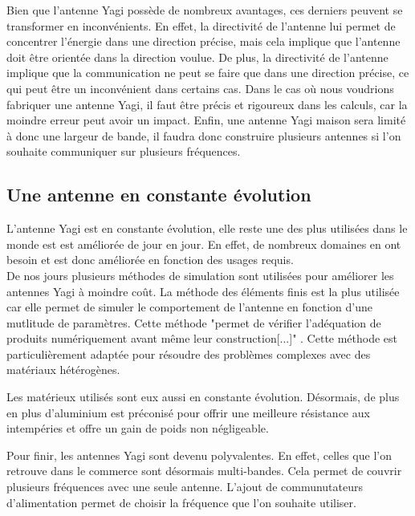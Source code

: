 \documentclass[12pt, a4paper]{article}
\begin{document}
Bien que l'antenne Yagi possède de nombreux avantages, ces derniers
peuvent se transformer en inconvénients. En effet, la directivité de l'antenne
lui permet de concentrer l'énergie dans une direction
précise, mais cela implique que l'antenne doit être
orientée dans la direction voulue. De plus, la directivité
de l'antenne implique que la communication ne peut se faire
que dans une direction précise, ce qui peut être un inconvénient
dans certains cas. Dans le cas où nous voudrions fabriquer
une antenne Yagi, il faut être précis et rigoureux dans
les calculs, car la moindre erreur peut avoir un impact. 
Enfin, une antenne Yagi maison sera limité à donc une
largeur de bande, il faudra donc construire plusieurs antennes
si l'on souhaite communiquer sur plusieurs fréquences.\\

\subsection{Une antenne en constante évolution}
L'antenne Yagi est en constante évolution, elle reste 
une des plus utilisées dans le monde est 
est améliorée de jour en jour. En effet, de nombreux 
domaines en ont besoin et est donc améliorée en
fonction des usages requis.\\

De nos jours plusieurs méthodes de simulation
sont utilisées pour améliorer les antennes Yagi à moindre
coût. La méthode des éléments finis est la plus utilisée
car elle permet de simuler le comportement de l'antenne
en fonction d'une mutlitude de paramètres. Cette méthode 
"permet de vérifier l'adéquation de produits 
numériquement avant même leur construction[...]" \cite{r3}.
Cette méthode est particulièrement adaptée pour 
résoudre des problèmes complexes avec des matériaux 
hétérogènes.

Les matérieux utilisés sont eux aussi en constante 
évolution. Désormais, de plus en plus d'aluminium 
est préconisé pour offrir une meilleure résistance 
aux intempéries et offre un gain de poids non négligeable.

Pour finir, les antennes Yagi sont devenu polyvalentes.
En effet, celles que l'on retrouve dans le commerce
sont désormais multi-bandes. Cela permet de couvrir
plusieurs fréquences avec une seule antenne. L'ajout
de communutateurs d'alimentation permet de choisir
la fréquence que l'on souhaite utiliser.\\
\end{document}
